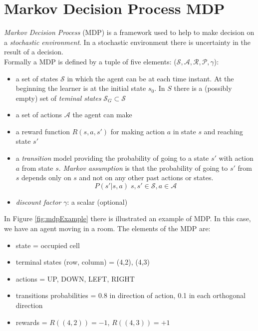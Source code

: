 \section{Markov Decision Process MDP}
\textit{Markov Decision Process} (MDP) is a framework used to help to make decision on a \textit{stochastic environment}. In a stochastic environment there is uncertainty in the result of a decision.\\
Formally a MDP is defined by a tuple of five elements: ($\mathcal{S}, \mathcal{A}, \mathcal{R}, \mathcal{P}, \gamma$):
\begin{itemize}
    \item a set of states $\mathcal{S}$ in which the agent can be at each time instant. At the beginning the learner is at the initial state $s_0$. In $S$ there is a (possibly empty) set of \textit{teminal states} $\mathcal{S}_G \subset \mathcal{S}$
    
    \item a set of actions $\mathcal{A}$ the agent can make
    
    \item a reward function $R(s,a,s')$ for making action $a$ in state $s$ and reaching state $s'$
    
    \item a \textit{transition} model providing the probability of going to a state $s'$ with action $a$ from state $s$. \textit{Markov assumption} is that the probability of going to $s'$ from $s$ depends only on $s$ and not on any other past actions or states.
    \begin{equation}
        P(s'|s,a) \; s,s' \in \mathcal{S}, a \in \mathcal{A}
    \end{equation}
    
    \item \textit{discount factor} $\gamma$: a scalar (optional)
\end{itemize}

In Figure \ref{fig:mdpExample} there is illustrated an example of MDP. In this case, we have an agent moving in a room. The elements of the MDP are:
\begin{itemize}
    \item state = occupied cell
    \item terminal states (row, column) = (4,2), (4,3)
    \item actions = UP, DOWN, LEFT, RIGHT
    \item transitions probabilities = 0.8 in direction of action, 0.1 in each orthogonal direction
    \item rewards = $R((4,2)) = -1$, $R((4,3)) = +1$
\end{itemize}

